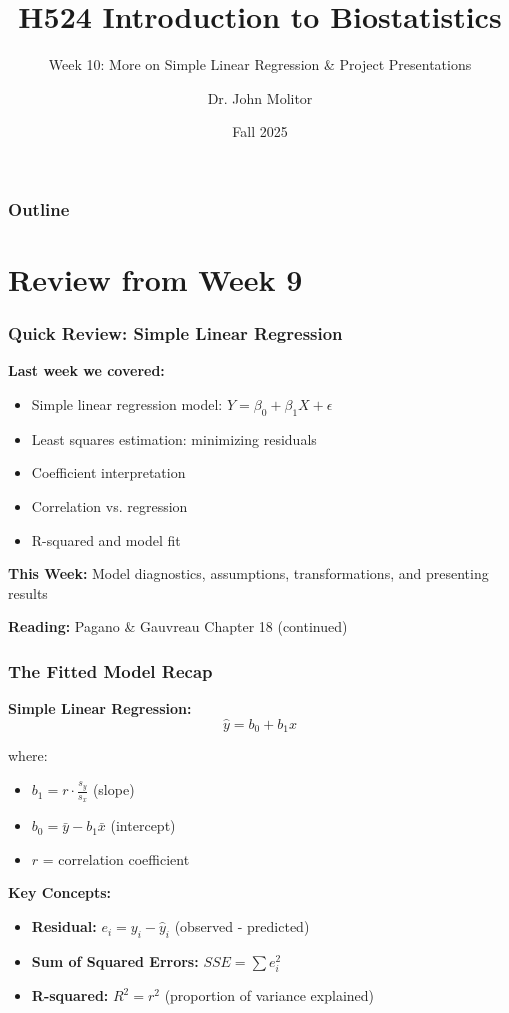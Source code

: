 \documentclass{beamer}
\title{H524 Introduction to Biostatistics}
\subtitle{Week 10: More on Simple Linear Regression \& Project Presentations}
\author{Dr. John Molitor}
\institute{}
\date{Fall 2025}
\begin{document}
\frame{\titlepage}

\begin{frame}
\frametitle{Outline}
\tableofcontents
\end{frame}

\section{Review from Week 9}

\begin{frame}
\frametitle{Quick Review: Simple Linear Regression}
\textbf{Last week we covered:}
\begin{itemize}
\item Simple linear regression model: $Y = \beta_0 + \beta_1 X + \epsilon$
\item Least squares estimation: minimizing residuals
\item Coefficient interpretation
\item Correlation vs. regression
\item R-squared and model fit
\end{itemize}

\vspace{0.5cm}
\textbf{This Week:} Model diagnostics, assumptions, transformations, and presenting results

\vspace{0.3cm}
\textbf{Reading:} Pagano \& Gauvreau Chapter 18 (continued)
\end{frame}

\begin{frame}
\frametitle{The Fitted Model Recap}
\textbf{Simple Linear Regression:}
$$\hat{y} = b_0 + b_1 x$$

\vspace{0.3cm}
where:
\begin{itemize}
\item $b_1 = r \cdot \frac{s_y}{s_x}$ (slope)
\item $b_0 = \bar{y} - b_1\bar{x}$ (intercept)
\item $r$ = correlation coefficient
\end{itemize}

\vspace{0.5cm}
\textbf{Key Concepts:}
\begin{itemize}
\item \textbf{Residual:} $e_i = y_i - \hat{y}_i$ (observed - predicted)
\item \textbf{Sum of Squared Errors:} $SSE = \sum e_i^2$
\item \textbf{R-squared:} $R^2 = r^2$ (proportion of variance explained)
\end{itemize}
\end{frame}
\end{document}
